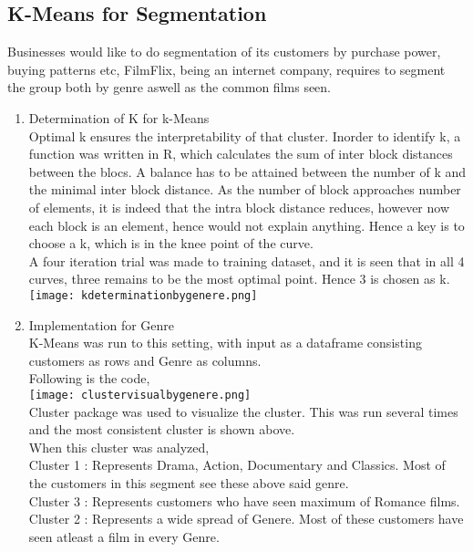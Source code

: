 \documentclass{article}
\begin{document}
\subsection{K-Means for Segmentation}
Businesses would like to do segmentation of its customers by purchase power, buying patterns etc, FilmFlix, being an internet company, requires to segment the group both by genre aswell as the common films seen.\\
\begin{enumerate}
\item Determination of K for k-Means\\
Optimal k ensures the interpretability of that cluster. Inorder to identify k, a function was written in R, which calculates the sum of inter block distances between the blocs. A balance has to be attained between the number of k and the minimal inter block distance. As the number of block approaches number of elements, it is indeed that the intra block distance reduces, however now each block is an element, hence would not explain anything. Hence a key is to choose a k, which is in the knee point of the curve.\\
A four iteration trial was made to training dataset, and it is seen that in all 4 curves, three remains to be the most optimal point. Hence 3 is chosen as k.\\
\texttt{[image: kdeterminationbygenere.png]}\\
\item Implementation for Genre\\
K-Means was run to this setting, with input as a dataframe consisting customers as rows and Genre as columns.\\
Following is the code,\\

\texttt{[image: clustervisualbygenere.png]}\\
Cluster package was used to visualize the cluster. This was run several times and the most consistent cluster is shown above.\\
When this cluster was analyzed,\\
Cluster 1 : Represents Drama, Action, Documentary and Classics. Most of the customers in this segment see these above said genre.\\
Cluster 3 : Represents customers who have seen maximum of Romance films.\\
Cluster 2 : Represents a wide spread of Genere. Most of these customers have seen atleast a film in every Genre.\\

\end{enumerate}
\end{document}

